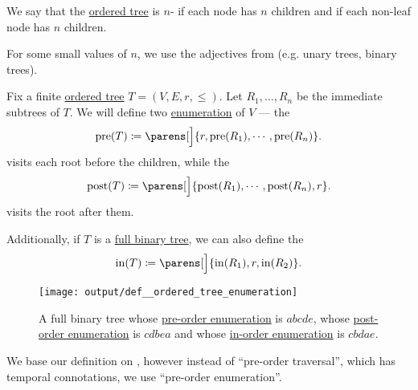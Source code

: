 \begin{definition}\label{def:n_ary_tree}
  We say that the \hyperref[def:ordered_tree]{ordered tree} is \( n \)- if each node has  \( n \) children and  if each non-leaf node has  \( n \) children.

  For some small values of \( n \), we use the adjectives from  (e.g. unary trees, binary trees).
\end{definition}

\begin{definition}\label{def:ordered_tree_enumeration}
  Fix a finite \hyperref[def:ordered_tree]{ordered tree} \( T = (V, E, r, \leq) \). Let \( R_1, \ldots, R_n \) be the immediate subtrees of \( T \). We will define two \hyperref[def:enumeration]{enumeration} of \( V \) --- the 
  \begin{equation}\label{eq:def:ordered_tree_enumeration/pre}
    \op{pre}(T) \coloneqq \parens[\Big]{ r, \op{pre}(R_1), \cdots, \op{pre}(R_n) }.
  \end{equation}
  visits each root before the children, while the 
  \begin{equation}\label{eq:def:ordered_tree_enumeration/post}
    \op{post}(T) \coloneqq \parens[\Big]{ \op{post}(R_1), \cdots, \op{post}(R_n), r }.
  \end{equation}
  visits the root after them.

  Additionally, if \( T \) is a \hyperref[def:n_ary_tree]{full binary tree}, we can also define the 
  \begin{equation}\label{eq:def:ordered_tree_enumeration/in}
    \op{in}(T) \coloneqq \parens[\Big]{ \op{in}(R_1), r, \op{in}(R_2) }.
  \end{equation}

  \begin{figure}[!ht]
    \centering
    \texttt{[image: output/def\_\_ordered\_tree\_enumeration]}
    \caption{A full binary tree whose \hyperref[eq:def:ordered_tree_enumeration/pre]{pre-order enumeration} is \( abcde \), whose \hyperref[eq:def:ordered_tree_enumeration/post]{post-order enumeration} is \( cdbea \) and whose \hyperref[eq:def:ordered_tree_enumeration/in]{in-order enumeration} is \( cbdae \).}
    \label{fig:def:ordered_tree_enumeration}
  \end{figure}
\end{definition}
\begin{comments}
  \item We base our definition on \cite[228]{Erickson2019}, however instead of \enquote{pre-order traversal}, which has temporal connotations, we use \enquote{pre-order enumeration}.
\end{comments}

